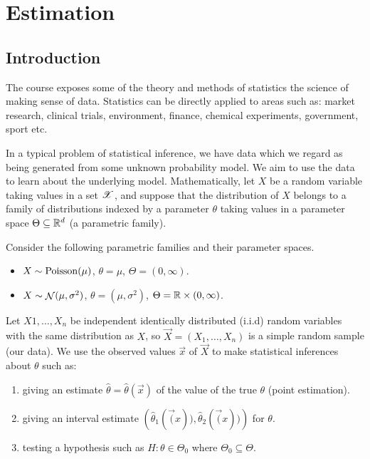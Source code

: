 
\chapter{Estimation}

\section{Introduction}
\label{sec:1.1}

The course exposes some of the theory and methods of statistics \textemdash{} the science of making sense of data. Statistics can be directly applied to areas such as: market research, clinical trials, environment, finance, chemical experiments, government, sport etc.

In a typical problem of statistical inference, we have data which we regard as being generated from some unknown probability model. We aim to use the data to learn about the underlying model. Mathematically, let $X$ be a random variable taking values in a set $\mathscr{X}$, and suppose that the distribution of $X$ belongs to a family of distributions indexed by a parameter $\theta$ taking values in a parameter space $\Theta \subseteq \mathbb{R}^d$ (a parametric family).

\begin{example}
Consider the following parametric families and their parameter spaces.
\begin{itemize}
\item  $X \sim \operatorname{Poisson} (\mu)$, $\theta = \mu$, $\Theta = (0, \infty)$.
\item $X \sim \mathop{\mathcal{N}}(\mu, \sigma^2)$, $\theta = (\mu, \sigma^2)$, $\Theta = \mathbb{R} \times (0, \infty)$.
\end{itemize}
\end{example}

Let $X1, \dotsc, X_n$  be independent identically distributed (i.i.d) random variables with the same distribution as $X$, so $\vec{X} = \left(X_1, \dotsc, X_n\right)$ is a simple random sample (our data). We use the observed values $\vec{x}$ of $\vec{X}$ to make statistical inferences about $\theta$ such as:
\begin{enumerate}
\item giving an estimate $\hat{\theta} = \hat{\theta}(\vec{x})$ of the value of the true $\theta$ (point estimation).
\item giving an interval estimate $\left(\hat{\theta}_1(\vec(x)), \hat{\theta}_2(\vec(x))\right)$ for $\theta$.
\item testing a hypothesis such as $H: \theta \in \Theta_0$ where $\Theta_0 \subseteq \Theta$.
\end{enumerate}

